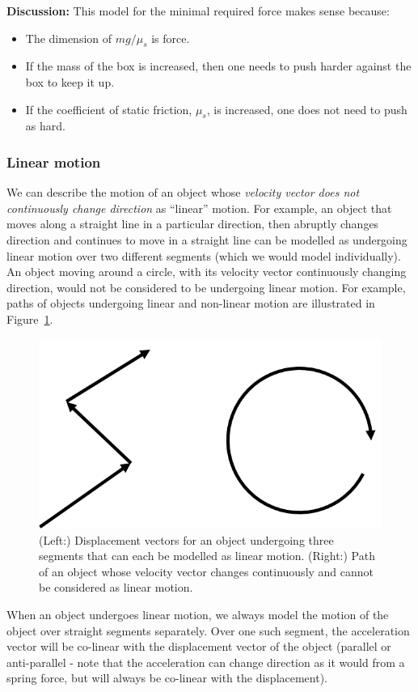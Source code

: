 \begin{framed}
\begin{framed}
\textbf{Discussion:} This model for the minimal required force makes sense because:

\begin{itemize}
\item The dimension of $mg/\mu_s$ is force.
\item If the mass of the box is increased, then one needs to push harder against the box to keep it up.
\item If the coefficient of static friction, $\mu_s$, is increased, one does not need to push as hard.
\end{itemize}
\end{framed}
\end{framed}

\subsubsection{Linear motion}

We can describe the motion of an object whose \textit{velocity vector does not continuously change direction} as ``linear'' motion. For example, an object that moves along a straight line in a particular direction, then abruptly changes direction and continues to move in a straight line can be modelled as undergoing linear motion over two different segments (which we would model individually). An object moving around a circle, with its velocity vector continuously changing direction, would not be considered to be undergoing linear motion. For example, paths of objects undergoing linear and non-linear motion are illustrated in Figure~\ref{fig:applyingnewtonslaws:linearmotion}.

\begin{figure}[!htbp]
\centering
\includegraphics[width=0.3\linewidth]{files/linearmotion-3c36fb7975de9f562924e0686e09b329.png}
\caption[]{(Left:) Displacement vectors for an object undergoing three segments that can each be modelled as linear motion. (Right:) Path of an object whose velocity vector changes continuously and cannot be considered as linear motion.}
\label{fig:applyingnewtonslaws:linearmotion}
\end{figure}

When an object undergoes linear motion, we always model the motion of the object over straight segments separately. Over one such segment, the acceleration vector will be co-linear with the displacement vector of the object (parallel or anti-parallel - note that the acceleration can change direction as it would from a spring force, but will always be co-linear with the displacement).

